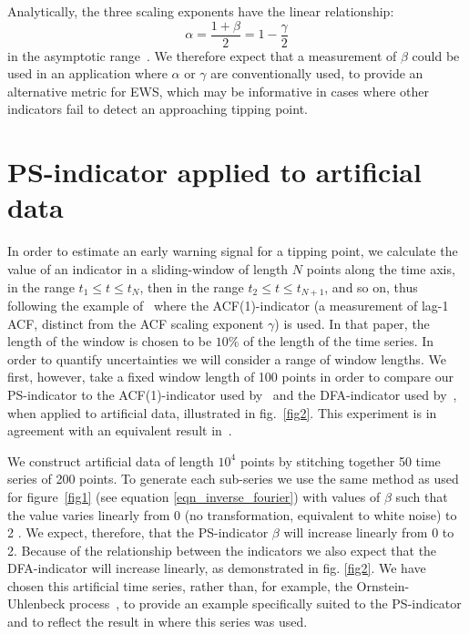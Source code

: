 \documentclass[doublecol]{epl2}
\begin{document}
Analytically, the three scaling exponents have the linear relationship:
\begin{equation} 
\alpha = \frac{1+\beta}{2} = 1 - \frac{\gamma}{2} 
\label{exponent_relationships} 
\end{equation} 
in the asymptotic range~\cite{kantelhardt2001}. 
We therefore expect that a measurement of $\beta$ 
could be used in an application where $\alpha$ or $\gamma$ 
are conventionally used, to provide an alternative metric for EWS, 
which may be informative in cases where other indicators fail to 
detect an approaching tipping point. 

\section{PS-indicator applied to artificial data}\label{subsec_artificialdata} 

In order to estimate an early warning signal for a tipping point, 
we calculate
the value of an indicator in a sliding-window of length $N$ 
points along the time axis, in the range $t_1\leq t \leq t_N$, 
then in the range $t_2\leq t\leq t_{N+1}$, and so on, thus 
following the example of~\cite{held2004} where the ACF(1)-indicator 
(a measurement of lag-1 ACF, distinct from the ACF scaling exponent 
$\gamma$) is used. In that paper, the length of the window is chosen 
to be $10\%$ of the length of the time series. In order to quantify 
uncertainties we will consider a range of window lengths. 
We first, however, take a fixed window length of 100 points 
in order to compare our PS-indicator to the ACF(1)-indicator 
used by~\cite{held2004} and the DFA-indicator used by~\cite{livina2007}, 
when applied to artificial data, illustrated in fig.~\ref{fig2}. 
This experiment is in agreement with an equivalent result 
in~\cite{livina2012}.

We construct artificial data of length $10^4$ points by stitching 
together 50 time series of 200 points. To generate each sub-series we use the same method as used for figure~\ref{fig1} 
(see equation \ref{eqn_inverse_fourier}) with values of $\beta$ 
such that the value varies linearly from 0 (no transformation, 
equivalent to white noise) to 2 \cite{makse1996}. We expect, 
therefore, that the PS-indicator $\beta$ will increase linearly 
from 0 to 2. Because of the relationship between the indicators 
we also expect that the DFA-indicator will increase linearly, 
as demonstrated in fig. \ref{fig2}. We have chosen 
this artificial time series, rather than, for example, the 
Ornstein-Uhlenbeck 
process~\cite{hasselmann1976stochastic, ditlevsen2010, ritchie2016},
to provide an example specifically suited to the PS-indicator and  
to reflect the result in \cite{livina2012} 
where this series was used.
\end{document}
